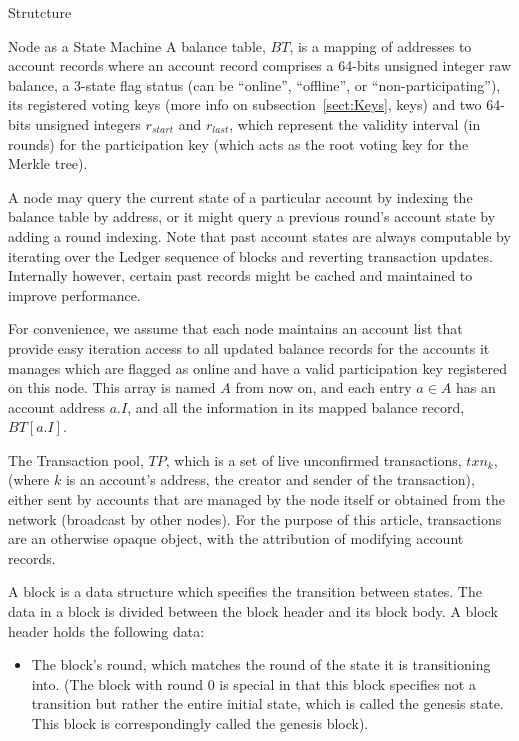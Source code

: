 \documentclass[10pt,a4paper]{article}
\begin{document}
\begin{section}{Strutcture}
\begin{subsection}{Node as a State Machine}
A {\sf balance table}, $BT$, is a mapping of addresses to 
account records where an {\sf account record} comprises 
 a 64-bits unsigned integer raw balance, 
 a 3-state flag status (can be ``online'', ``offline'', or ``non-participating''),
 its registered voting keys (more info on subsection~\ref{sect:Keys}, keys) and 
 two 64-bits unsigned integers $r_{start}$ and $r_{last}$, which represent the 
   validity interval (in rounds)
   for the participation key (which acts as the root voting key for the Merkle 
   tree).

A node may query the current state of a particular account by indexing the balance 
table by address, or it might query a previous round's account state by adding a 
round indexing. 
Note that past account states are always computable by iterating over the Ledger
sequence of blocks and reverting transaction updates. Internally however, certain
past records might be cached and maintained to improve performance.

For convenience, we assume that each node maintains an account list that provide 
easy iteration access to all updated balance records for the accounts it manages 
which are flagged as online and have a valid participation key registered on this
node. 
This array is named $A$ from now on, and each entry $a\in A$ has an account address 
$a.I$, and all the information in its mapped balance record, $BT[a.I]$.

The Transaction pool, $TP$, which is a set of live unconfirmed transactions, $txn_k$, (where 
$k$ is an account's address, the creator and sender of the transaction), either
sent by accounts that are managed by the node itself or obtained from the network 
(broadcast by other nodes).
For the purpose of this article, transactions are an otherwise opaque object, with the 
attribution of modifying account records.

A {\sf block} is a data structure which specifies the transition between states.
The data in a block is divided between the block header and its block body.
A block header holds the following data:
\begin{itemize}
    \item
    The block's round, which matches the round of the state it is transitioning
    into. (The block with round 0 is special in that this block specifies not
    a transition but rather the entire initial state, which is called the genesis
    state. This block is correspondingly called the genesis block).
    

\end{itemize}
\end{subsection}
\end{section}
\end{document}
